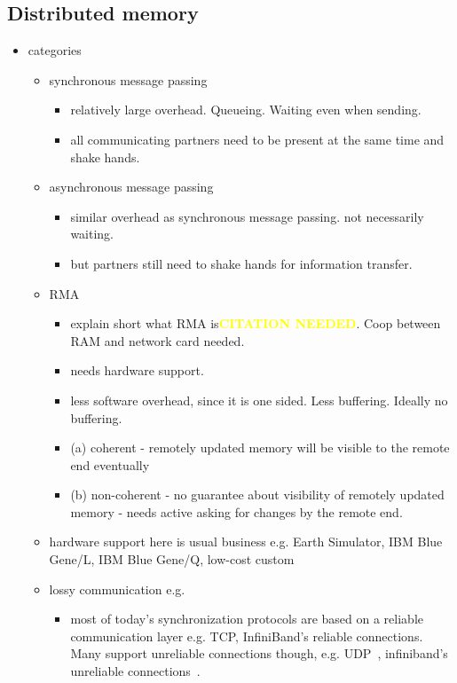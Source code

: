 \documentclass[a4paper, 10pt]{article}
\def \citationneeded{\textbf{\textcolor{yellow}{CITATION NEEDED}}}
\begin{document}
\subsection{Distributed memory}
\begin{itemize}
	\item categories
		\begin{itemize}
			\item synchronous message passing
				\begin{itemize}
					\item relatively large overhead. Queueing. Waiting even when sending.
					\item all communicating partners need to be present at the same time and shake hands.
				\end{itemize}
			\item asynchronous message passing
				\begin{itemize}
					\item similar overhead as synchronous message passing. not necessarily waiting.
					\item but partners still need to shake hands for information transfer.
				\end{itemize}
			\item RMA
				\begin{itemize}
					\item explain short what RMA is\citationneeded. Coop between RAM and network card needed.
					\item needs hardware support.
					\item less software overhead, since it is one sided. Less buffering. Ideally no buffering.
					\item (a) coherent - remotely updated memory will be visible to the remote end eventually
					\item (b) non-coherent - no guarantee about visibility of remotely updated memory - needs active asking for changes by the remote end.
				\end{itemize}
			\item hardware support here is usual business e.g. Earth Simulator\cite{earthsimulator}, IBM Blue Gene/L\cite{bluegenel}, IBM Blue Gene/Q\cite{bluegeneq}, low-cost custom\cite{hoefler2006b}
			\item lossy communication e.g.
				\begin{itemize}
					\item most of today's synchronization protocols are based on a reliable communication layer e.g. TCP, InfiniBand's reliable connections. Many support unreliable connections though, e.g. UDP~\cite{udp}, infiniband's unreliable connections~\cite{infiniband}.

\end{itemize}
\end{itemize}
\end{itemize}
\end{document}

